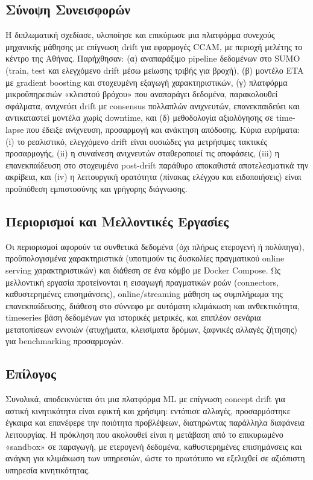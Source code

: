 \subsection*{Σύνοψη Συνεισφορών}
Η διπλωματική σχεδίασε, υλοποίησε και επικύρωσε μια πλατφόρμα συνεχούς μηχανικής μάθησης με επίγνωση drift για εφαρμογές CCAM, με περιοχή μελέτης το κέντρο της Αθήνας.
Παρήχθησαν: (α) αναπαράξιμο pipeline δεδομένων στο SUMO (train, test και ελεγχόμενο drift μέσω μείωσης τριβής για βροχή), (β) μοντέλο ETA με gradient boosting και στοχευμένη εξαγωγή χαρακτηριστικών, (γ) πλατφόρμα μικροϋπηρεσιών «κλειστού βρόχου» που αναπαράγει δεδομένα, παρακολουθεί σφάλματα, ανιχνεύει drift με consensus πολλαπλών ανιχνευτών, επανεκπαιδεύει και αντικαταστεί μοντέλα χωρίς downtime, και (δ) μεθοδολογία αξιολόγησης σε time-lapse που έδειξε ανίχνευση, προσαρμογή και ανάκτηση απόδοσης.
Κύρια ευρήματα: (i) το ρεαλιστικό, ελεγχόμενο drift είναι ουσιώδες για μετρήσιμες τακτικές προσαρμογής, (ii) η συναίνεση ανιχνευτών σταθεροποιεί τις αποφάσεις, (iii) η επανεκπαίδευση στο στοχευμένο post-drift παράθυρο αποκαθιστά αποτελεσματικά την ακρίβεια, και (iv) η λειτουργική ορατότητα (πίνακας ελέγχου και ειδοποιήσεις) είναι προϋπόθεση εμπιστοσύνης και γρήγορης διάγνωσης.

\subsection*{Περιορισμοί και Μελλοντικές Εργασίες}
Οι περιορισμοί αφορούν τα συνθετικά δεδομένα (όχι πλήρως ετερογενή ή πολύπηγα), προϋπολογισμένα χαρακτηριστικά (υποτιμούν τις δυσκολίες πραγματικού online serving χαρακτηριστικών) και διάθεση σε ένα κόμβο με Docker Compose.
Ως μελλοντική εργασία προτείνονται η εισαγωγή πραγματικών ροών (connectors, καθυστερημένες επισημάνσεις), online/streaming μάθηση ως συμπλήρωμα της επανεκπαίδευσης, διάθεση στο σύννεφο με αυτόματη κλιμάκωση και ανθεκτικότητα, timeseries βάση δεδομένων για ιστορικές μετρικές, και επιπλέον σενάρια μετατοπίσεων εννοιών (ατυχήματα, κλεισίματα δρόμων, ξαφνικές αλλαγές ζήτησης) για benchmarking προσαρμογών.

\subsection*{Επίλογος}
Συνολικά, αποδεικνύεται ότι μια πλατφόρμα ML με επίγνωση concept drift για αστική κινητικότητα είναι εφικτή και χρήσιμη: εντόπισε αλλαγές, προσαρμόστηκε έγκαιρα και επανέφερε την ποιότητα προβλέψεων, διατηρώντας παράλληλα διαφάνεια λειτουργίας.
Η πρόκληση που ακολουθεί είναι η μετάβαση από το επικυρωμένο «sandbox» σε παραγωγή, με ετερογενή δεδομένα, καθυστερημένες επισημάνσεις και ανάγκη για κλιμάκωση των υπηρεσιών, ώστε το πρωτότυπο να εξελιχθεί σε αξιόπιστη υπηρεσία κινητικότητας.
